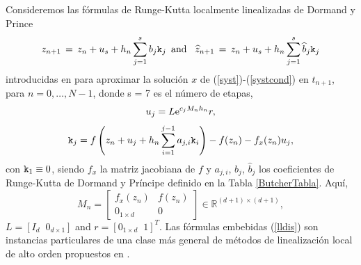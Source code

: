 Consideremos las fórmulas de Runge-Kutta localmente linealizadas de Dormand y Prince
\begin{equation} \label{lldis}
    z_{n+1}\,=\,z_n+u_s+h_n \sum_{j=1}^{s}b_j \mathtt{k}_j \,\,\, \text{and} \,\,\, \
    \widehat{z}_{n+1}\,=\, z_n+u_s+h_n \sum_{j=1}^{s}\widehat{b}_j \mathtt{k}_j
\end{equation}
introducidas en \cite{Jimenez14AMC} para aproximar la solución $x$ de (\ref{syst})-(\ref{systcond}) en $t_{n+1}$, para $n=0,\ldots,N -1$, donde s = 7 es el número de etapas,
\begin{equation*}
u_j=L\mathrm{e}^{c_j M_n h_n}r,
\end{equation*}
\begin{equation*}
\mathtt{k}_j = f\left( z_n+u_j+h_n \sum_{i=1}^{j-1}a_{j,i}\mathtt{k}_i \right) - f( z_n) - f_x(z_n)u_j,
\end{equation*}
con $\mathtt{k}_1 \equiv 0$, siendo $f_x$ la matriz jacobiana de $f$ y $a_{j,i}$, $b_j$, $\widehat{b}_j$ los coeficientes de Runge-Kutta de Dormand y Príncipe definido en la Tabla \ref{ButcherTabla}. Aquí,
\begin{equation*}
    M_{n}=\left[
    \begin{array}{cc}
        f_{x}(z_{n}) & f(z_{n}) \\
        0_{1\times d} & 0
    \end{array}
    \right] \in \mathbb{R}^{(d+1)\times (d+1)},
\end{equation*}
$ L=[I_d \;\; 0_{d\times 1}] $ and $r=[0_{1\times d}\;\; 1]^T$. Las fórmulas embebidas (\ref{lldis}) son instancias particulares de una clase más general de métodos de linealización local de alto orden propuestos en \cite{Jimenez13}.

